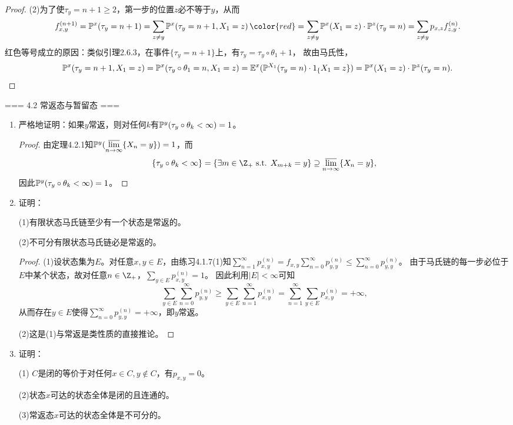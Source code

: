 \begin{enumerate}
\begin{proof}
        (2)为了使$\tau_y=n+1\geqslant2$，第一步的位置$z$必不等于$y$，从而
        \[f_{x,y}^{(n+1)}=\P^x(\tau_y=n+1)=\sum_{z\neq y}\P^x(\tau_y=n+1,X_1=z)\,{\color{red}=}\,
        \sum_{z\neq y}\P^x(X_1=z)\cdot\P^z(\tau_y=n)=\sum_{z\neq y}p_{x,z}f_{z,y}^{(n)}.\]
        红色等号成立的原因：类似引理2.6.3，在事件$\{\tau_y=n+1\}$上，有$\tau_y=\tau_y\circ\theta_1+1$，
        故由马氏性，\[\P^x(\tau_y=n+1,X_1=z)=\P^x(\tau_y\circ\theta_1=n,X_1=z)=
        \E^x(\P^{X_1}(\tau_y=n)\cdot1_\{X_1=z\})=\P^x(X_1=z)\cdot\P^z(\tau_y=n).\]
    \end{proof}
\end{enumerate}

=== 4.2 常返态与暂留态 ===
\begin{enumerate}
    \item[4.2.2] 严格地证明：如果$y$常返，则对任何$k$有$\P^y(\tau_y\circ\theta_k<\infty)=1$。
    \begin{proof}
        由定理4.2.1知$\P^y(\varlimsup\limits_{n\to\infty}\{X_n=y\})=1$，而
        \[\{\tau_y\circ\theta_k<\infty\}=\{\exists m\in\Z_+\st X_{m+k}=y\}\supseteq\varlimsup_{n\to\infty}\{X_n=y\},\]
        因此$\P^y(\tau_y\circ\theta_k<\infty)=1$。
    \end{proof}
    \item[4.2.3] 证明：

    (1)有限状态马氏链至少有一个状态是常返的。

    (2)不可分有限状态马氏链必是常返的。
    \begin{proof}
        (1)设状态集为$E$。对任意$x,y\in E$，由练习4.1.7(1)知$\sum\limits_{n=1}^\infty p_{x,y}^{(n)}
        =f_{x,y}\sum\limits_{n=0}^\infty p_{y,y}^{(n)}\leqslant\sum\limits_{n=0}^\infty p_{y,y}^{(n)}$。
        由于马氏链的每一步必位于$E$中某个状态，故对任意$n\in\Z_+$，$\sum\limits_{y\in E}p_{x,y}^{(n)}=1$。
        因此利用$|E|<\infty$可知\[\sum_{y\in E}\sum_{n=0}^\infty p_{y,y}^{(n)}\geqslant
        \sum_{y\in E}\sum_{n=1}^\infty p_{x,y}^{(n)}=\sum_{n=1}^\infty\sum_{y\in E}p_{x,y}^{(n)}=+\infty,\]
        从而存在$y\in E$使得$\sum\limits_{n=0}^\infty p_{y,y}^{(n)}=+\infty$，即$y$常返。

        (2)这是(1)与常返是类性质的直接推论。
    \end{proof}
    \item[4.2.7] 证明：

    (1) $C$是闭的等价于对任何$x\in C,y\notin C$，有$p_{x,y}=0$。

    (2)状态$x$可达的状态全体是闭的且连通的。

    (3)常返态$x$可达的状态全体是不可分的。


\end{enumerate}
